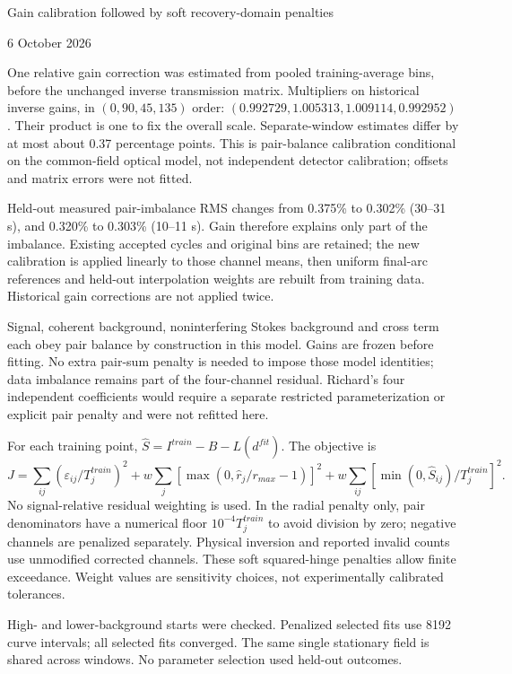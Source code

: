 \documentclass[10pt,a4paper]{article}
\begin{document}
{\Large Gain calibration followed by soft recovery-domain penalties}\par 6 October 2026

One relative gain correction was estimated from pooled training-average bins, before the unchanged inverse transmission matrix. Multipliers on historical inverse gains, in $(0,90,45,135)$ order: $(0.992729,1.005313,1.009114,0.992952)$. Their product is one to fix the overall scale. Separate-window estimates differ by at most about 0.37 percentage points. This is pair-balance calibration conditional on the common-field optical model, not independent detector calibration; offsets and matrix errors were not fitted.

Held-out measured pair-imbalance RMS changes from 0.375\% to 0.302\% (30--31 s), and 0.320\% to 0.303\% (10--11 s). Gain therefore explains only part of the imbalance. Existing accepted cycles and original bins are retained; the new calibration is applied linearly to those channel means, then uniform final-arc references and held-out interpolation weights are rebuilt from training data. Historical gain corrections are not applied twice.

Signal, coherent background, noninterfering Stokes background and cross term each obey pair balance by construction in this model. Gains are frozen before fitting. No extra pair-sum penalty is needed to impose those model identities; data imbalance remains part of the four-channel residual. Richard's four independent coefficients would require a separate restricted parameterization or explicit pair penalty and were not refitted here.

For each training point, $\widehat S=I^{train}-B-L(d^{fit})$. The objective is
\[
J=\sum_{ij}(\varepsilon_{ij}/T_j^{train})^2
+w\sum_j[\max(0,\widehat r_j/r_{max}-1)]^2
+w\sum_{ij}[\min(0,\widehat S_{ij})/T_j^{train}]^2.
\]
No signal-relative residual weighting is used. In the radial penalty only, pair denominators have a numerical floor $10^{-4}T_j^{train}$ to avoid division by zero; negative channels are penalized separately. Physical inversion and reported invalid counts use unmodified corrected channels. These soft squared-hinge penalties allow finite exceedance. Weight values are sensitivity choices, not experimentally calibrated tolerances.

High- and lower-background starts were checked. Penalized selected fits use 8192 curve intervals; all selected fits converged. The same single stationary field is shared across windows. No parameter selection used held-out outcomes.
\end{document}
